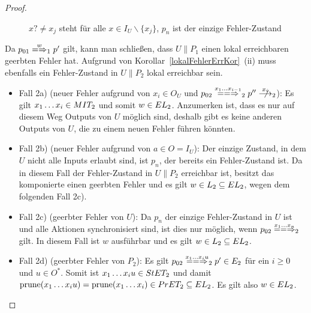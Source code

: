 \begin{proof}
\begin{itemize}
\begin{figure} [h!tbp]
\begin{center}
        \caption{$x?\neq x_j$ steht für alle $x\in I_U\backslash\{x_j\}$, $p_n$
          ist der einzige Fehler-Zustand}
      \label{UmitE}
      \end{center}
      \end{figure}
      Da $p_{01}\weakmay[w]_1p'$ gilt, kann man schließen, dass $U\|P_1$ einen
      lokal erreichbaren geerbten Fehler hat. Aufgrund von
      Korollar~\ref{lokalFehlerErrKor}~(ii) muss ebenfalls ein Fehler-Zustand
      in $U\|P_2$ lokal erreichbar sein.
      \begin{itemize}
        \item Fall 2a) (neuer Fehler aufgrund von $x_i\in O_U$ und $p_{02}
          \lweakmay[x_1\dots x_{i-1}]_2p''\nmust[x_i]_2$): Es gilt $x_1\dots
          x_i\in MIT _2$ und somit $w\in EL_2$. Anzumerken ist, dass es nur
          auf diesem Weg Outputs von $U$ möglich sind, deshalb gibt es keine
          anderen Outputs von $U$, die zu einem neuen Fehler führen könnten.
        \item Fall 2b) (neuer Fehler aufgrund von $a\in O=I_U$): Der einzige
          Zustand, in dem $U$ nicht alle Inputs erlaubt sind, ist $p_n$, der
          bereits ein Fehler-Zustand ist. Da in diesem Fall der Fehler-Zustand
          in $U\|P_2$ erreichbar ist, besitzt das komponierte \MEIO{} einen
          geerbten Fehler und es gilt $w\in L_2\subseteq EL _2$, wegen dem
          folgenden Fall 2c).
        \item Fall 2c) (geerbter Fehler von $U$): Da $p_n$ der einzige
          Fehler-Zustand in $U$ ist und alle Aktionen synchronisiert sind, ist
          dies nur möglich, wenn $p_{02} \lweakmay[x_1\dots x_n]_2$ gilt. In
          diesem Fall ist $w$ ausführbar und es gilt $w\in L_2\subseteq EL
          _2$.
        \item Fall 2d) (geerbter Fehler von $P_2$): Es gilt $p_{02}
          \lweakmay[x_1\dots x_iu]_2 p'\in E_2$ für ein $i\geq 0$ und $u\in
          O^*$. Somit ist $x_1\dots x_iu\in StET _2$ und damit $\mathrm{prune}
          (x_1\dots x_iu) =\mathrm{prune} (x_1\dots x_i)\in PrET _2\subseteq EL _2$.
          Es gilt also $w\in EL _2$.
      \end{itemize}
  \end{itemize}
\end{proof}


